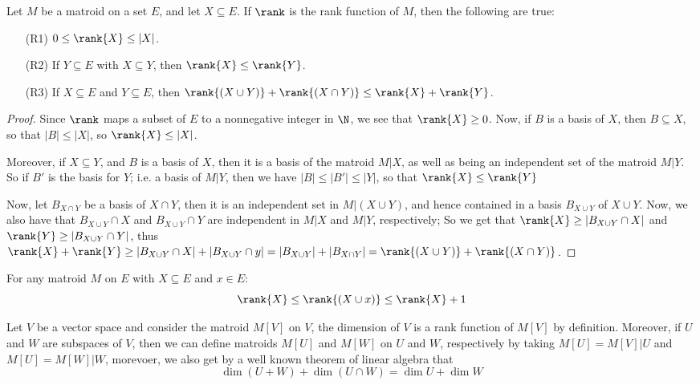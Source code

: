 \begin{lemma}\label{1.3.1}
    Let $M$ be a matroid on a set  $E$, and let $X \subseteq E$. If $\rank$ is
    the rank function of  $M$, then the following are true:
    \begin{enumerate}
        \item[(R1)] $0 \leq \rank{X} \leq |X|$.

        \item[(R2)] If  $Y \subseteq E$ with  $X \subseteq Y$, then  $\rank{X}
            \leq \rank{Y}$.

        \item[(R3)] If $X \subseteq E$ and  $Y \subseteq E$, then $\rank{(X \cup
            Y)}+\rank{(X \cap Y)} \leq \rank{X}+\rank{Y}$.
    \end{enumerate}
\end{lemma}
\begin{proof}
    Since $\rank$ maps a subset of $E$ to a nonnegative integer in $\N$, we see
    that  $\rank{X} \geq 0$. Now, if $B$ is a basis of $X$, then  $B \subseteq
    X$, so that  $|B| \leq |X|$, so  $\rank{X} \leq |X|$.

    Moreover, if $X \subseteq Y$, and  $B$ is a basis
    of  $X$, then it is a basis of the matroid  $M|X$, as well as being an
    independent set of the matroid $M|Y$. So if  $B'$ is the basis for  $Y$;
    i.e. a basis of  $M|Y$, then we have  $|B| \leq |B'| \leq |Y|$, so that
    $\rank{X} \leq \rank{Y}$

    Now, let $B_{X \cap Y}$ be a basis of $X \cap Y$, then it is an independent
    set in  $M|(X \cup Y)$, and hence contained in a basis $B_{X \cup Y}$ of $X
    \cup Y$. Now, we also have that  $B_{X \cup Y} \cap X$ and $B_{X \cup Y}
    \cap Y$ are independent in  $M|X$ and  $M|Y$, respectively; So we get that
    $\rank{X} \geq |B_{X \cup Y} \cap X|$ and $\rank{Y} \geq |B_{X \cup Y} \cap
    Y|$, thus $\rank{X}+\rank{Y} \geq |B_{X \cup Y} \cap X|+|B_{X \cup Y} \cap
    y|=|B_{X \cup Y}|+|B_{X \cap Y}|=\rank{(X \cup Y)}+\rank{(X \cap Y)}$.
\end{proof}
\begin{corollary}
    For any matroid $M$ on  $E$ with $X \subseteq E$ and  $x \in E$:
    \begin{equation*}
        \rank{X} \leq \rank{(X \cup x)} \leq \rank{X}+1
    \end{equation*}
\end{corollary}

\begin{example}\label{1.11}
    Let $V$ be a vector space and consider the matroid $M[V]$ on $V$, the
    dimension of $V$ is a rank function of $M[V]$ by definition. Moreover, if
    $U$ and  $W$ are subspaces of  $V$, then we can define matroids  $M[U]$ and
    $M[W]$ on $U$ and  $W$, respectively by taking  $M[U]=M[V]|U$ and
    $M[U]=M[W]|W$, morevoer, we also get by a well known theorem of linear
    algebra that
    \begin{equation*}
        \dim{(U+W)}+\dim{(U \cap W)}=\dim{U}+\dim{W}
    \end{equation*}
\end{example}

